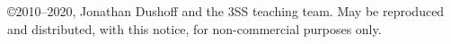 \copyright 2010--2020, Jonathan Dushoff and the 3SS teaching team.  May be reproduced and distributed, with this notice, for non-commercial purposes only.
